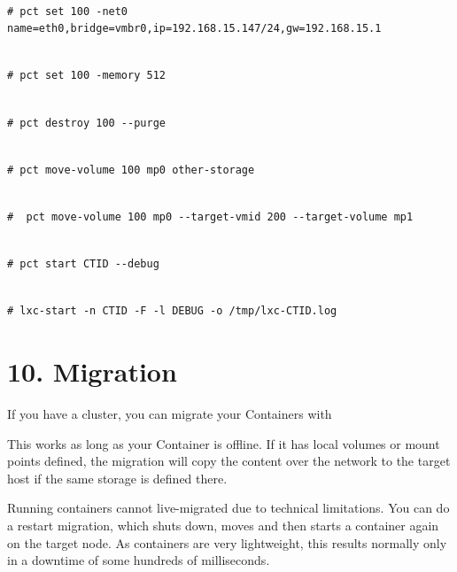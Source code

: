 \begin{lstlisting}

# pct set 100 -net0 name=eth0,bridge=vmbr0,ip=192.168.15.147/24,gw=192.168.15.1

\end{lstlisting}

\begin{lstlisting}

# pct set 100 -memory 512

\end{lstlisting}

\begin{lstlisting}

# pct destroy 100 --purge

\end{lstlisting}

\begin{lstlisting}

# pct move-volume 100 mp0 other-storage

\end{lstlisting}

\begin{lstlisting}

#  pct move-volume 100 mp0 --target-vmid 200 --target-volume mp1

\end{lstlisting}

\begin{lstlisting}

# pct start CTID --debug

\end{lstlisting}

\begin{lstlisting}

# lxc-start -n CTID -F -l DEBUG -o /tmp/lxc-CTID.log

\end{lstlisting}


\section{10. Migration}

If you have a cluster, you can migrate your Containers with

This works as long as your Container is offline. If it has local volumes or mount points defined, the migration will copy the content over the network to the target host if the same storage is defined there.

Running containers cannot live-migrated due to technical limitations. You can do a restart migration, which shuts down, moves and then starts a container again on the target node. As containers are very lightweight, this results normally only in a downtime of some hundreds of milliseconds.

